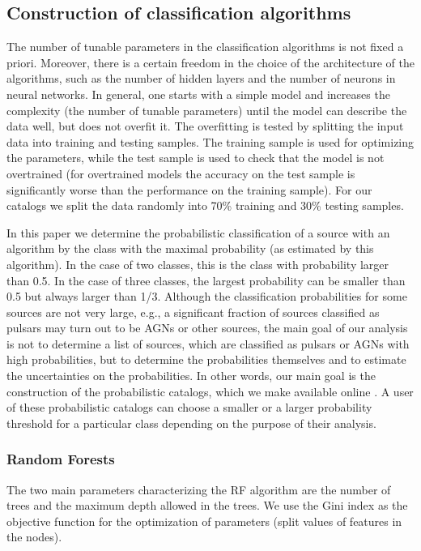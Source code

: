 \documentclass{aa}
\newcommand{\lb}{\label}
\begin{document}
\subsection{Construction of classification algorithms}

The number of tunable parameters in the classification algorithms is not fixed a priori. 
Moreover, there is a certain freedom in the choice of the architecture of the algorithms, such as
the number of hidden layers and the number of neurons in neural networks.
In general, one starts with a simple model and increases the complexity (the number of tunable parameters)
until the model can describe the data well, but does not overfit it.
The overfitting is tested by splitting the input data into training and testing samples.
The training sample is used for optimizing the parameters,
while the test sample is used to check that the model is not overtrained (for overtrained models the accuracy on the test
sample is significantly worse than the performance on the training sample).
For our catalogs we split the data randomly into 70\% training and 30\% testing samples.

In this paper we determine the probabilistic classification of a source with an algorithm by the class with the maximal probability (as estimated by this algorithm). In the case of two classes, this is the class with probability larger than 0.5. In the case of three classes, the largest probability can be smaller than 0.5 but always larger than 1/3. Although the classification probabilities for some sources are not very large, e.g., a significant fraction of sources classified as pulsars may turn out to be AGNs or other sources, the main goal of our analysis is not to determine a list of sources, which are classified as pulsars or AGNs with high probabilities, but to determine the probabilities themselves and to estimate the uncertainties on the probabilities. In other words, our main goal is the construction of the probabilistic catalogs, which we make available online \citep{SOM_material}. A user of these probabilistic catalogs can choose a smaller or a larger probability threshold for a particular class depending on the purpose of their analysis.


\subsubsection{Random Forests}
\lb{sec:rf}

The two main parameters characterizing the RF algorithm are the number of trees and the maximum depth allowed in the trees. 
We use the Gini index as the objective function for the optimization of parameters (split values of features in the nodes).
\end{document}
